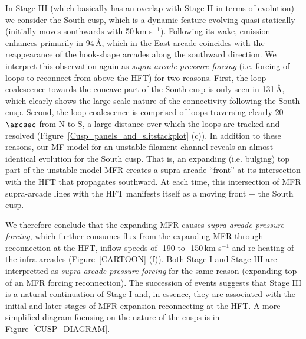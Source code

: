 \documentclass[preprint]{aastex}
\begin{document}
In Stage III (which basically has an overlap with Stage II in terms of evolution) we consider the South cusp, which is a dynamic feature evolving quasi-statically (initially moves southwards with 50\,km s$^{-1}$). Following its wake, emission enhances primarily in 94\,\AA, which in the East arcade coincides with the reappearance of the hook-shape arcades along the southward direction. We interpret this observation again as \emph{supra-arcade pressure forcing} (i.e. forcing of loops to reconnect from above the HFT) for two reasons. First, the loop coalescence towards the concave part of the South cusp is only seen in 131\,\AA, which clearly shows the large-scale nature of the connectivity following the South cusp. Second, the loop coalescence is comprised of loops traversing clearly 20$\arcsec$ from N to S, a large distance over which the loops are tracked and resolved (Figure~\ref{Cusp_panels_and_slitstackplot} (c)). In addition to these reasons, our MF model for an unstable filament channel reveals an almost identical evolution for the South cusp. That is, an expanding (i.e. bulging) top part of the unstable model MFR creates a supra-arcade ``front'' at its intersection with the HFT that propagates southward. At each time, this intersection of MFR supra-arcade lines with the HFT manifests itself as a moving front $-$ the South cusp. 


We therefore conclude that the expanding MFR causes \emph{supra-arcade pressure forcing}, which further consumes flux from the expanding MFR through reconnection at the HFT, inflow speeds of -190 to -150\,km s$^{-1}$ and re-heating of the infra-arcades (Figure~\ref{CARTOON} (f)). Both Stage I and Stage III are interpretted as \emph{supra-arcade pressure forcing} for the same reason (expanding top of an MFR forcing reconnection). The succession of events suggests that Stage III is a natural continuation of Stage I and, in essence, they are associated with the initial and later stages of MFR expansion reconnecting at the HFT. A more simplified diagram focusing on the nature of the cusps is in Figure~\ref{CUSP_DIAGRAM}.
\end{document}
